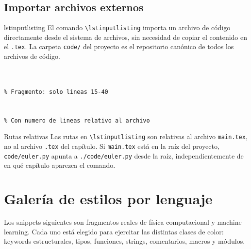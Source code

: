 \subsection{Importar archivos externos}
\label{subsec:lstinputlisting}

\begin{definicion}{lstinputlisting}
\label{def:lstinputlisting}
El comando \texttt{\textbackslash lstinputlisting} importa un archivo de
código directamente desde el sistema de archivos, sin necesidad de copiar
el contenido en el \texttt{.tex}. La carpeta \texttt{code/} del proyecto
es el repositorio canónico de todos los archivos de código.
\end{definicion}

\begin{lstlisting}[style=latex, frame=none, numbers=none]
% Archivo completo


% Fragmento: solo lineas 15-40


% Con numero de lineas relativo al archivo

\end{lstlisting}

\begin{observacion}{Rutas relativas}
Las rutas en \texttt{\textbackslash lstinputlisting} son relativas al
archivo \texttt{main.tex}, no al archivo \texttt{.tex} del capítulo.
Si \texttt{main.tex} está en la raíz del proyecto, \texttt{code/euler.py}
apunta a \texttt{./code/euler.py} desde la raíz, independientemente de
en qué capítulo aparezca el comando.
\end{observacion}

\section{Galería de estilos por lenguaje}
\label{sec:galeria}

Los snippets siguientes son fragmentos reales de física computacional y
machine learning. Cada uno está elegido para ejercitar las distintas clases
de color: keywords estructurales, tipos, funciones, strings, comentarios,
macros y módulos.

